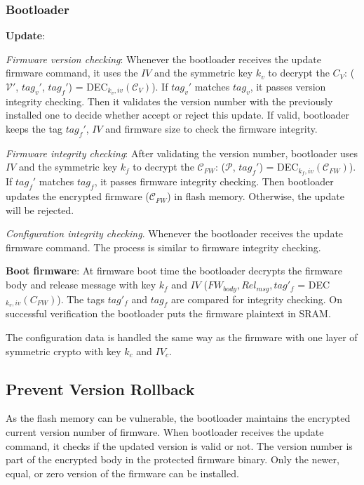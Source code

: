 \documentclass[11pt,oneside,onecolumn,letterpaper]{article}
\begin{document}
\subsubsection{Bootloader}

\textbf{Update}: 

\textit{Firmware version checking}:
Whenever the bootloader receives the update firmware command, it uses the $IV$ and the symmetric key $k_v$ to decrypt the $C_V$: ($\mathcal{V}'$, $tag_v'$, $tag_f'$) = DEC$_{k_v, iv}(\mathcal{C}_V)$).
If $tag_v'$ matches $tag_v$, it passes version integrity checking.
Then it validates the version number with the previously installed one to decide whether accept or reject this update.
If valid, bootloader keeps the tag $tag_f'$, $IV$ and firmware size to check the firmware integrity.

\textit{Firmware integrity checking}:
After validating the version number, bootloader uses $IV$ and the symmetric key $k_f$ to decrypt the $\mathcal{C}_{FW}$: ($\mathcal{P}$, $tag_f'$) = DEC$_{k_f, iv}(\mathcal{C}_{FW})$).
If $tag_f'$ matches $tag_f$, it passes firmware integrity checking.
Then bootloader updates the encrypted firmware ($\mathcal{C}_{FW}$) in flash memory.
Otherwise, the update will be rejected.

\textit{Configuration integrity checking}.
Whenever the bootloader receives the update firmware command.
The process is similar to firmware integrity checking.

\textbf{Boot firmware}: 
At firmware boot time the bootloader decrypts the firmware body and release message with key $k_f$ and $IV$ ($FW_{body}, Rel_{msg}, tag'_f$ = DEC$_{k_v, iv}(C_{FW})$).
The tags $tag'_f$ and $tag_f$ are compared for integrity checking.
On successful verification the bootloader puts the firmware plaintext in SRAM.

The configuration data is handled the same way as the firmware with one layer of symmetric crypto with key $k_c$ and $IV_c$.

\subsection{Prevent Version Rollback}
As the flash memory can be vulnerable, the bootloader maintains the encrypted current version number of firmware.
When bootloader receives the update command, it checks if the updated version is valid or not.
The version number is part of the encrypted body in the protected firmware binary.
Only the newer, equal, or zero version of the firmware can be installed.
\end{document}

